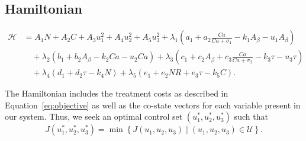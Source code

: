 \documentclass[12pt]{article}
\theoremstyle{definition}
\begin{document}
\subsection{Hamiltonian}

\begin{equation*}
\label{eq:hamiltonian}
\begin{split}
    \mathcal H &= A_1 N + A_2 C + A_3 u_1^2 + A_4 u_2^2 + A_5 u_3^2 + \lambda_1 \left( a_1 + a_2 \frac{Ca}{Ca + \sigma_1} - k_1 A_\beta - u_1 A_\beta \right) \\
    &\quad + \lambda_2 \left( b_1 + b_2 A_\beta - k_2 Ca - u_2 Ca \right) + \lambda_3 \left( c_1 + c_2 A_\beta + c_3 \frac{Ca}{Ca + \sigma_2} - k_3 \tau - u_3 \tau \right) \\
    &\quad + \lambda_4 \left( d_1 + d_2 \tau - k_4 N \right) + \lambda_5 \left( e_1 + e_2 NR + e_3 \tau - k_5 C \right) .
\end{split}
\end{equation*} \bigskip

The Hamiltonian includes the treatment costs as described in Equation~\eqref{eq:objective} as well as the co-state vectors for each variable present in our system. Thus, we seek an optimal control set $(u_1^*, u_2^*, u_3^*)$ such that 
\begin{equation*}
    J(u_1^*, u_2^*, u_3^*) = \min \left\{ J(u_1, u_2, u_3) \mid (u_1, u_2, u_3) \in \mathcal U \right\}.
\end{equation*} \bigskip
\end{document}

